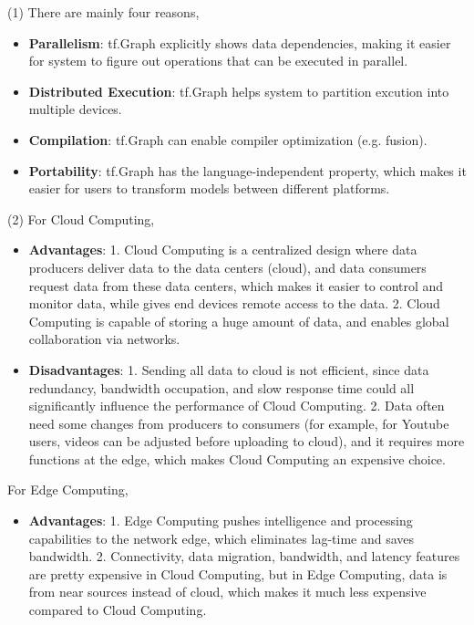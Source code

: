 \documentclass[11pt]{article}
\begin{document}



\begin{solution}
\item (1) There are mainly four reasons,
\begin{itemize}
\item \textbf{Parallelism}: tf.Graph explicitly shows data dependencies, making it easier for system to figure out operations that can be executed in parallel.
\item \textbf{Distributed Execution}: tf.Graph helps system to partition excution into multiple devices.
\item \textbf{Compilation}: tf.Graph can enable compiler optimization (e.g. fusion).
\item \textbf{Portability}: tf.Graph has the language-independent property, which makes it easier for users to transform models between different platforms.
\end{itemize}
\item (2) For Cloud Computing,
\begin{itemize}
\item \textbf{Advantages}: 1. Cloud Computing is a centralized design where data producers deliver data to the data centers (cloud), and data consumers request data from these data centers, which makes it easier to control and monitor data, while gives end devices remote access to the data. 2. Cloud Computing is capable of storing a huge amount of data, and enables global collaboration via networks.
\item \textbf{Disadvantages}: 1. Sending all data to cloud is not efficient, since data redundancy, bandwidth occupation, and slow response time could all significantly influence the performance of Cloud Computing. 2. Data often need some changes from producers to consumers (for example, for Youtube users, videos can be adjusted before uploading to cloud), and it requires more functions at 
the edge, which makes Cloud Computing an expensive choice.
\end{itemize}
For Edge Computing,
\begin{itemize}
\item \textbf{Advantages}: 1. Edge Computing pushes intelligence and processing capabilities to the network edge, which eliminates lag-time and saves bandwidth. 2. Connectivity, data migration, bandwidth, and latency features are pretty expensive in Cloud Computing, but in Edge Computing, data is from near sources instead of cloud, which makes it much less expensive compared to Cloud Computing.

\end{itemize}
\end{solution}
\end{document}
